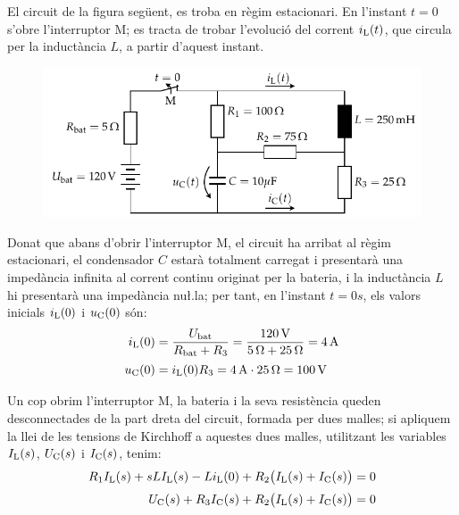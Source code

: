 \begin{exemple}

El circuit de la figura seg\"{u}ent, es troba en r\`{e}gim estacionari. En
l'instant $t=0$ s'obre l'interruptor M; es tracta de trobar
l'evoluci\'{o} del corrent $i_\mathrm{L}(t)$, que circula per la induct\`{a}ncia
$L$, a partir d'aquest instant.

\begin{figure}[h]
    \centering
    \includegraphics{Imatges/Cap-Laplace-Exemple3-Circuit.pdf}
\end{figure}

 Donat que abans d'obrir l'interruptor M, el circuit ha arribat al
 r\`{e}gim estacionari, el condensador $C$ estar\`{a} totalment carregat  i
 presentar\`{a} una imped\`{a}ncia infinita al corrent continu originat per la
 bateria, i la induct\`{a}ncia $L$ hi presentar\`{a} una imped\`{a}ncia nu{\l.l}a;
 per tant, en l'instant $t=0\unit{s}$, els valors inicials $i_\mathrm{L}(0)$ i
 $u_\mathrm{C}(0)$ s\'{o}n:
 \begin{align*}
    i_\mathrm{L}(0) &= \frac{U_\mathrm{bat}}{R_\mathrm{bat} + R_3} = \frac{120\mathrm{\,V}}
    {5\mathrm{\,\mathrm{\Omega}} + 25\mathrm{\,\mathrm{\Omega}}} = 4\mathrm{\,A} \\[0.5ex]
    u_\mathrm{C}(0) &= i_\mathrm{L}(0) R_3 = 4\mathrm{\,A}\cdot 25\mathrm{\,\mathrm{\Omega}} = 100\mathrm{\,V}
 \end{align*}

Un cop obrim l'interruptor M, la bateria i la seva resist\`{e}ncia
queden desconnectades de la part dreta del circuit, formada per dues
malles; si apliquem la llei de les tensions de Kirchhoff  a aquestes
dues malles, utilitzant les variables $I_\mathrm{L}(s)$, $U_\mathrm{C}(s)$ i
$I_\mathrm{C}(s)$, tenim:
\begin{align*}
    R_1 I_\mathrm{L}(s) + s L I_\mathrm{L}(s) - L i_\mathrm{L}(0) + R_2
    \bigl(I_\mathrm{L}(s) + I_\mathrm{C}(s)\bigr) &=0 \\[0.5ex]
    U_\mathrm{C}(s) + R_3 I_\mathrm{C}(s) + R_2 \bigl(I_\mathrm{L}(s) + I_\mathrm{C}(s)\bigr) &=0
\end{align*}


\end{exemple}
